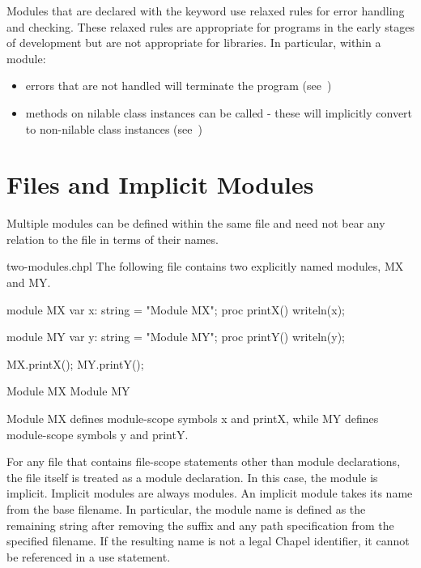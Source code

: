 Modules that are declared with the  keyword use relaxed
rules for error handling and  checking. These relaxed rules are
appropriate for programs in the early stages of development but are not
appropriate for libraries. In particular, within a  module:

\begin{itemize}

  \item errors that are not handled will terminate the program
        (see~)

  \item methods on nilable class instances can be called - these will
        implicitly convert to non-nilable class instances
        (see~)

\end{itemize}

\section{Files and Implicit Modules}
\label{Implicit_Modules}

Multiple modules can be defined within the same file and need not bear any
relation to the file in terms of their names.

\begin{chapelexample}{two-modules.chpl}
The following file contains two explicitly named modules, MX and MY.
\begin{chapel}
module MX {
  var x: string = "Module MX";
  proc printX() {
    writeln(x);
  }
}

module MY {
  var y: string = "Module MY";
  proc printY() {
    writeln(y);
  }
}
\end{chapel}
\begin{chapelpost}
MX.printX();
MY.printY();
\end{chapelpost}
\begin{chapeloutput}
Module MX
Module MY
\end{chapeloutput}
Module MX defines module-scope symbols x and printX, while MY
defines module-scope symbols y and printY.
\end{chapelexample}

For any file that contains file-scope statements other than module
declarations, the file itself is treated as a module declaration.
In this case,
the module is implicit. Implicit modules are always 
modules. An implicit module takes its name from the base filename.  In
particular, the module name is defined as the remaining string after
removing the  suffix and any path specification from the
specified filename.  If the resulting name is not a legal Chapel
identifier, it cannot be referenced in a use statement.

